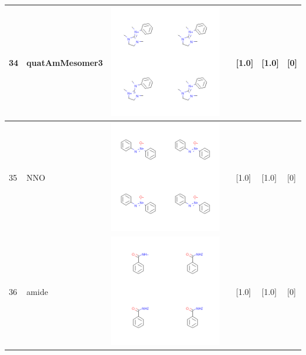 \begin{longtable}{|l|l|l|l|l|l|l|}
34 & quatAmMesomer3 & \includegraphics[scale=0.6]{quatAmMesomer3MV.png} & & [1.0]& [1.0] & [0] \\
\hline
35 & NNO & \includegraphics[scale=0.6]{NNOMV.png} & & [1.0]& [1.0] & [0] \\
\hline
36 & amide & \includegraphics[scale=0.6]{amideMV.png} & & [1.0]& [1.0] & [0] \\

\end{longtable}
